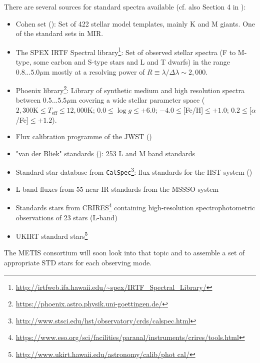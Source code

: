 There are several sources for standard spectra available (cf. also Section 4 in \cite{METIS-calibration_plan}):
\begin{itemize}
    \item Cohen set (\cite{coh99}): Set of 422 stellar model templates, mainly K and M giants. One of the standard sets in \ac{MIR}.
    \item The SPEX \ac{IRTF} Spectral library\footnote{\url{http://irtfweb.ifa.hawaii.edu/~spex/IRTF_Spectral_Library/}}: Set of observed stellar spectra (F to M-type, some carbon and S-type stars and L and T dwarfs) in the range $0.8...5.0\mu$m mostly at a resolving power of $R\equiv\lambda/\Delta\lambda\sim2,000$.
    \item Phoenix library\footnote{\url{https://phoenix.astro.physik.uni-goettingen.de/}}\cite{phoenix}: Library of synthetic medium and high resolution spectra between $0.5...5.5\mu$m covering a wide stellar parameter space ($2,300\textrm{K}\leq T_\textrm{eff}\leq12,000\textrm{K}$; $0.0\leq\log g\leq+6.0$; $-4.0\leq$[Fe/H]$\leq+1.0$; $0.2\leq$[$\alpha$/Fe]$\leq+1.2$).
    \item Flux calibration programme of the \ac{JWST} (\cite{gor22})
    \item "van der Bliek" standards (\cite{vdb96}): 253 L and M band standards
    \item Standard star database from \texttt{CalSpec}\footnote{\url{http://www.stsci.edu/hst/observatory/crds/calspec.html}}: flux standards for the \ac{HST} system (\cite{boh14})
    \item L-band fluxes from 55 near-IR standards from the MSSSO system \cite{mcg94}
    \item Standards stars from CRIRES\footnote{\url{https://www.eso.org/sci/facilities/paranal/instruments/crires/tools.html}} containing high-resolution spectrophotometric observations of 23 stars (L-band)
    \item  UKIRT standard stars\footnote{\url{http://www.ukirt.hawaii.edu/astronomy/calib/phot cal/}}
\end{itemize}
The \ac{METIS} consortium will soon look into that topic and to assemble a set of appropriate \ac{STD} stars for each observing mode.

